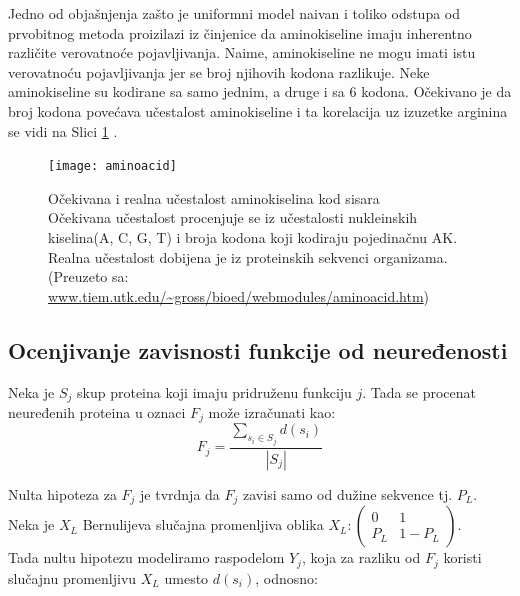 Jedno od objašnjenja zašto je uniformni model naivan i toliko odstupa od
prvobitnog metoda proizilazi iz činjenice da aminokiseline imaju inherentno
različite verovatnoće pojavljivanja. Naime, aminokiseline ne mogu  imati istu
verovatnoću pojavljivanja jer se  broj njihovih kodona razlikuje. Neke aminokiseline
su kodirane sa samo jednim, a druge i sa 6 kodona. Očekivano je da broj kodona
povećava učestalost aminokiseline i ta korelacija uz izuzetke arginina se vidi
na Slici \ref{fig:aminoacid} \parencite{AKfrekvencija}.

\begin{figure}[th]
\centering
\texttt{[image: aminoacid]}
\caption{Očekivana i realna učestalost  aminokiselina kod sisara\\ \footnotesize
Očekivana učestalost procenjuje se iz učestalosti nukleinskih kiselina(A, C, G, T) i broja kodona koji kodiraju pojedinačnu AK.
Realna učestalost dobijena je iz proteinskih sekvenci organizama.
(Preuzeto sa: \url{www.tiem.utk.edu/~gross/bioed/webmodules/aminoacid.htm})}
\label{fig:aminoacid}
\end{figure}




\clearpage
\subsection{Ocenjivanje zavisnosti funkcije od neuređenosti}

Neka je $S_j$ skup proteina koji imaju pridruženu funkciju $j$. Tada se procenat
neuređenih proteina u oznaci $F_j$ može izračunati kao:
$$F_j = \dfrac{\sum_{s_i \in S_j} d(s_i)} {|S_j|} $$



Nulta hipoteza za $F_j$ je tvrdnja da $F_j$ zavisi samo od dužine sekvence tj. $P_L$. \\
Neka je $X_L$ Bernulijeva slučajna promenljiva oblika $X_L : \begin{pmatrix} 0 & 1\\ P_L & 1-P_L \end{pmatrix}$. \\
Tada nultu hipotezu modeliramo raspodelom $Y_j$, koja za razliku od $F_j$ koristi
slučajnu promenljivu $X_L$ umesto  $d(s_i)$, odnosno:



